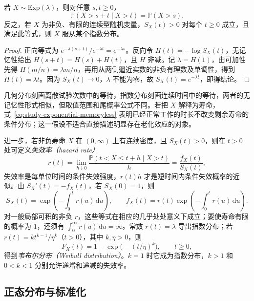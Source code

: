 \begin{theorem}[指数分布的无记忆性及刻画]
\label{thm:study-exponential-memoryless}
若 $X\sim\mathrm{Exp}(\lambda)$，则对任意 $s,t\ge0$，
\begin{equation}
  \mathbb P(X>s+t\mid X>t)=\mathbb P(X>s).
  \label{eq:study-exponential-memoryless}
\end{equation}
反之，若 $X$ 为非负、有限的连续型随机变量，$S_X(t)>0$ 对每个 $t\ge0$ 成立，且满足此等式，则 $X$ 服从某个指数分布。
\end{theorem}

\begin{proof}
正向等式为 $e^{-\lambda(s+t)}/e^{-\lambda t}=e^{-\lambda s}$。反向令 $H(t)=-\log S_X(t)$，无记忆性给出 $H(s+t)=H(s)+H(t)$，且 $H$ 非减。记 $\lambda=H(1)$，由可加性先得 $H(m/n)=\lambda m/n$，再用从两侧逼近实数的非负有理数及单调性，得到 $H(t)=\lambda t$。因为 $S_X(t)\to0$，$\lambda$ 不能为零，故 $S_X(t)=e^{-\lambda t}$，即得结论。
\end{proof}

几何分布刻画离散试验次数中的等待，指数分布刻画连续时间中的等待，两者的无记忆性形式相似，但取值范围和尾概率公式不同。若把 $X$ 解释为寿命，式~\eqref{eq:study-exponential-memoryless} 表明已经正常工作的时长不改变剩余寿命的条件分布；这一假设不适合直接描述明显存在老化效应的对象。

进一步，若非负寿命 $X$ 在 $(0,\infty)$ 上有连续密度，且 $S_X(t)>0$，则在 $t>0$ 处可定义\emph{失效率（hazard rate）}
\begin{equation}
  r(t)=\lim_{h\downarrow0}
    \frac{\mathbb P(t<X\le t+h\mid X>t)}{h}
  =\frac{f_X(t)}{S_X(t)},
  \label{eq:study-hazard-rate}
\end{equation}
失效率是每单位时间的条件失效强度，$r(t)h$ 才是短时间内条件失效概率的近似。由 $S_X'(t)=-f_X(t)$，若 $S_X(0)=1$，则
\begin{equation}
  S_X(t)=\exp\left(-\int_0^tr(u)\,\mathrm du\right),\qquad
  f_X(t)=r(t)\exp\left(-\int_0^tr(u)\,\mathrm du\right).
  \label{eq:study-hazard-survival}
\end{equation}
对一般局部可积的非负 $r$，这些等式在相应的几乎处处意义下成立；要使寿命有限的概率为 $1$，还须有 $\int_0^{\infty}r(u)\,\mathrm du=\infty$。常数 $r(t)=\lambda$ 导出指数分布；若 $r(t)=kt^{k-1}/\eta^k$（$t>0$），其中 $k,\eta>0$，则
\[
  F_X(t)=1-\exp\bigl(-(t/\eta)^k\bigr),\qquad t\ge0,
\]
得到\emph{韦布尔分布（Weibull distribution）}。$k=1$ 时它成为指数分布，$k>1$ 和 $0<k<1$ 分别允许递增和递减的失效率。

\subsection{正态分布与标准化}
\label{subsec:study-normal}

